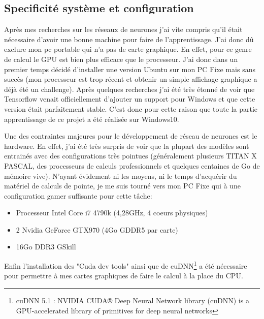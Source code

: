 \documentclass[a4paper,12pt]{report}
\begin{document}
      \subsection{Specificité système et configuration}
      Après mes recherches sur les réseaux de neurones j'ai vite compris qu'il était nécessaire d'avoir une bonne machine pour faire de l'apprentissage. J'ai donc dû exclure mon pc portable qui n'a pas de carte graphique. 
      \medbreak
      En effet, pour ce genre de calcul le GPU est bien plus efficace que le processeur. J'ai donc dans un premier temps décidé d'installer une version Ubuntu sur mon PC Fixe mais sans succès (mon processeur est trop récent et obtenir un simple affichage graphique a déjà été un challenge). 
      \medbreak
      Après quelques recherches j'ai été très étonné de voir que Tensorflow venait officiellement d'ajouter un support pour Windows et que cette version était parfaitement stable. C'est donc pour cette raison que toute la partie apprentissage de ce projet a été réalisée sur Windows10.
      \bigbreak

      Une des contraintes majeures pour le développement de réseau de neurones est le hardware. En effet, j'ai été très surpris de voir que la plupart des modèles sont entrainés avec des configurations très pointues (généralement plusieurs TITAN X PASCAL, des processeurs de calculs professionnels et quelques centaines de Go de mémoire vive). N'ayant évidement ni les moyens, ni le temps d'acquérir du matériel de calculs de pointe, je me suis tourné vers mon PC Fixe qui à une configuration gamer suffisante pour cette tâche:
      \begin{itemize}
        \item Processeur Intel Core i7 4790k (4,28GHz, 4 coeurs physiques)
        \item 2 Nvidia GeForce GTX970 (4Go GDDR5 par carte)
        \item 16Go DDR3 GSkill
      \end{itemize}
      \bigbreak

      Enfin l'installation des "Cuda dev tools" ainsi que de cuDNN\footnote{cuDNN 5.1 : NVIDIA CUDA® Deep Neural Network library (cuDNN) is a GPU-accelerated library of primitives for deep neural networks} a été nécessaire pour permettre à mes cartes graphiques de faire le calcul à la place du CPU.      
\end{document}
